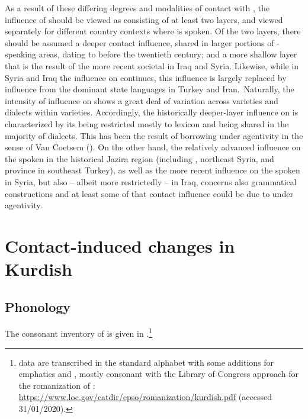 \documentclass[output=paper]{langsci/langscibook}
\begin{document}
As a result of these differing degrees and modalities of contact with , the influence of  should be viewed as consisting of at least two layers, and viewed separately for different country contexts where  is spoken. Of the two layers, there should be assumed a deeper contact influence, shared in larger portions of -speaking areas, dating to before the twentieth century; and a more shallow layer that is the result of the more recent societal  in Iraq and Syria. Likewise, while in Syria and Iraq the  influence on  continues, this influence is largely replaced by influence from the dominant state languages in Turkey and Iran.~Naturally, the intensity of  influence on  shows a great deal of variation across  varieties and dialects within varieties. Accordingly, the historically deeper-layer  influence on  is characterized by its being restricted mostly to lexicon and being shared in the majority of  dialects. This has been the result of borrowing under  agentivity in the sense of Van Coetsem (\citeyear{VanCoetsem1988,VanCoetsem2000}). On the other hand, the relatively advanced  influence on the  spoken in the historical Jazira region (including , northeast Syria, and  province in southeast Turkey), as well as the more recent  influence on the  spoken in Syria, but also – albeit more restrictedly – in Iraq, concerns also grammatical constructions and at least some of that contact influence could be due to  under  agentivity.    

\section{Contact-induced changes in Kurdish} 

\subsection{\label{bkm:Ref14688184}Phonology}

The consonant inventory of  is given in .\footnote{ data are transcribed in the standard   alphabet with some additions for emphatics and , mostly consonant with the Library of Congress approach for the romanization of : \url{https://www.loc.gov/catdir/cpso/romanization/kurdish.pdf} (accessed 31/01/2020).} 
\end{document}

